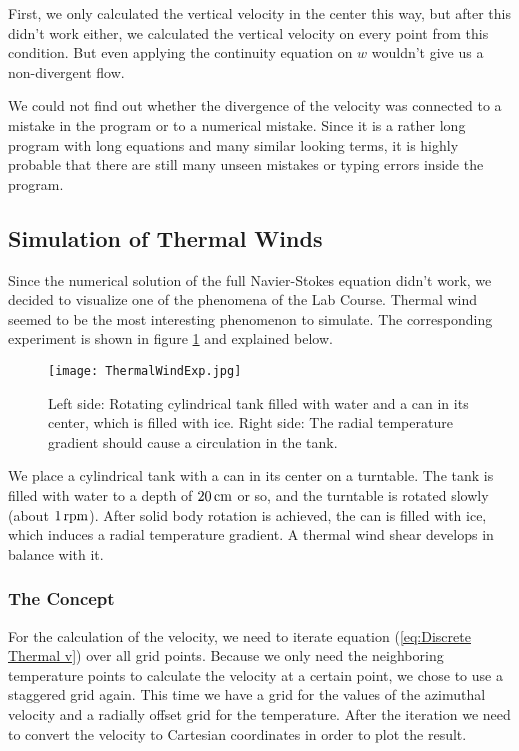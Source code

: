 \documentclass[12pt, a4paper]{article} %
\begin{document}
			First, we only calculated the vertical velocity in the center this way, but after this didn't work either, we calculated the vertical velocity on every point from this condition. But even applying the continuity equation on $w$ wouldn't give us a non-divergent flow.
			
			We could not find out whether the divergence of the velocity was connected to a mistake in the program or to a numerical mistake. Since it is a rather long program with long equations and many similar looking terms, it is highly probable that there are still many unseen mistakes or typing errors inside the program.
			\newpage
			
	\subsection{Simulation of Thermal Winds}
		Since the numerical solution of the full Navier-Stokes equation didn't work, we decided to visualize one of the phenomena of the Lab Course. Thermal wind seemed to be the most interesting phenomenon to simulate. The corresponding experiment is shown in figure \ref{fig:TWExperiment} and explained below.
		
		\begin{figure}[h]
			\centering
			\texttt{[image: ThermalWindExp.jpg]}
			\caption{Left side: Rotating cylindrical tank filled with water and a can in its center, which is filled with ice. Right side: The radial temperature gradient should cause a circulation in the tank.} %
			\label{fig:TWExperiment}
		\end{figure}
		
		We place a cylindrical tank with a can in its center on a turntable. The tank is filled with water to a depth of $\unit[20]{cm}$ or so, and the turntable is rotated slowly (about $\unit[1]{rpm}$). After solid body rotation is achieved, the can is filled with ice, which induces a radial temperature gradient. A thermal wind shear develops in balance with it.
		
				
		\subsubsection{The Concept}  %
			For the calculation of the velocity, we need to iterate equation (\ref{eq:Discrete Thermal v}) over all grid points. Because we only need the neighboring temperature points to calculate the velocity at a certain point, we chose to use a staggered grid again. This time we have a grid for the values of the azimuthal velocity and a radially offset grid for the temperature. After the iteration we need to convert the velocity to Cartesian coordinates in order to plot the result.
			
\end{document}
